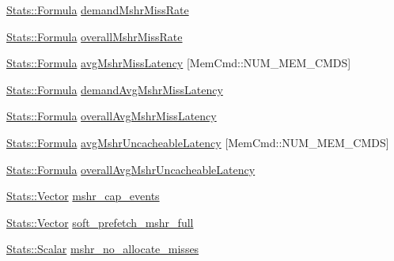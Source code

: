 \begin{DoxyCompactItemize}
\item 
\hyperlink{classStats_1_1Formula}{Stats::Formula} \hyperlink{group__CacheStatistics_gab2368c54094c318b31b50fd594422e7d}{demandMshrMissRate}
\item 
\hyperlink{classStats_1_1Formula}{Stats::Formula} \hyperlink{group__CacheStatistics_ga041b1609c62fdc738bc7f66172ee5c7d}{overallMshrMissRate}
\item 
\hyperlink{classStats_1_1Formula}{Stats::Formula} \hyperlink{group__CacheStatistics_gabab885accb53d71c843ad12bc0a928e7}{avgMshrMissLatency} \mbox{[}MemCmd::NUM\_\-MEM\_\-CMDS\mbox{]}
\item 
\hyperlink{classStats_1_1Formula}{Stats::Formula} \hyperlink{group__CacheStatistics_ga0fba53068815c749879bd3ec5aed871f}{demandAvgMshrMissLatency}
\item 
\hyperlink{classStats_1_1Formula}{Stats::Formula} \hyperlink{group__CacheStatistics_gabb74e2451414ec42c24792cdea6a6060}{overallAvgMshrMissLatency}
\item 
\hyperlink{classStats_1_1Formula}{Stats::Formula} \hyperlink{group__CacheStatistics_gaf6ebe7e4d284c4f93fd2ec80828e0e82}{avgMshrUncacheableLatency} \mbox{[}MemCmd::NUM\_\-MEM\_\-CMDS\mbox{]}
\item 
\hyperlink{classStats_1_1Formula}{Stats::Formula} \hyperlink{group__CacheStatistics_gaabd47c5862f5963ede65d408a3776412}{overallAvgMshrUncacheableLatency}
\item 
\hyperlink{classStats_1_1Vector}{Stats::Vector} \hyperlink{group__CacheStatistics_gab4ea8c6f8941356804bb9de4885a7ff4}{mshr\_\-cap\_\-events}
\item 
\hyperlink{classStats_1_1Vector}{Stats::Vector} \hyperlink{group__CacheStatistics_ga673f963f100608daf064537a4dde7ec7}{soft\_\-prefetch\_\-mshr\_\-full}
\item 
\hyperlink{classStats_1_1Scalar}{Stats::Scalar} \hyperlink{group__CacheStatistics_ga031ceb1999386dd8e6f8e9355942d9eb}{mshr\_\-no\_\-allocate\_\-misses}
\end{DoxyCompactItemize}
